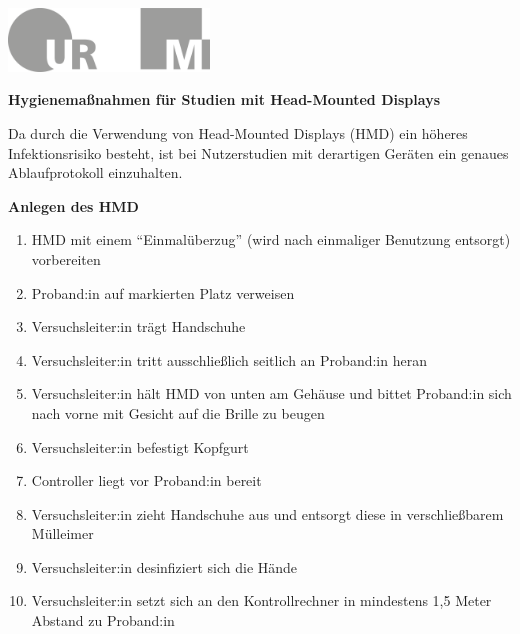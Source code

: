 \documentclass[24pt, a4paper, portrait]{article}
\begin{document}
\pagestyle{empty}

\raggedleft

\includegraphics[width=0.4\textwidth]{logo}

\vspace{1cm}
\sffamily
\centering
\huge

\textbf{Hygienemaßnahmen für Studien mit Head-Mounted Displays}

\vspace{1cm}

\raggedright
\Large

Da durch die Verwendung von Head-Mounted Displays (HMD) ein höheres Infektionsrisiko besteht, ist bei Nutzerstudien mit derartigen Geräten ein genaues Ablaufprotokoll einzuhalten.

\vspace{0.5cm}

\textbf{Anlegen des HMD}

\large

\begin{enumerate}
    \item HMD mit einem “Einmalüberzug” (wird nach einmaliger Benutzung entsorgt) vorbereiten
    \item Proband:in auf markierten Platz verweisen 
    \item Versuchsleiter:in trägt Handschuhe
    \item Versuchsleiter:in tritt ausschließlich seitlich an Proband:in heran
    \item Versuchsleiter:in hält HMD von unten am Gehäuse und bittet Proband:in sich nach vorne mit Gesicht auf die Brille zu beugen 
    \item Versuchsleiter:in befestigt Kopfgurt 
    \item Controller liegt vor Proband:in bereit 
    \item Versuchsleiter:in zieht Handschuhe aus und entsorgt diese in verschließbarem Mülleimer
    \item Versuchsleiter:in desinfiziert sich die Hände
    \item Versuchsleiter:in setzt sich an den Kontrollrechner in mindestens 1,5 Meter Abstand zu Proband:in
\end{enumerate}

\vspace{0.5cm}
\end{document}
